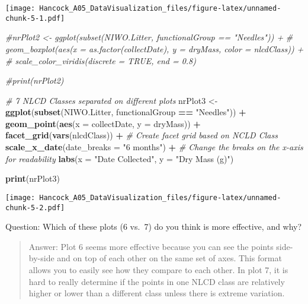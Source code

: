 \documentclass[
]{article}
\newenvironment{Shaded}{\begin{snugshade}}{\end{snugshade}}
\newcommand{\CommentTok}[1]{\textcolor[rgb]{0.56,0.35,0.01}{\textit{#1}}}
\newcommand{\DataTypeTok}[1]{\textcolor[rgb]{0.13,0.29,0.53}{#1}}
\newcommand{\KeywordTok}[1]{\textcolor[rgb]{0.13,0.29,0.53}{\textbf{#1}}}
\newcommand{\NormalTok}[1]{#1}
\newcommand{\OperatorTok}[1]{\textcolor[rgb]{0.81,0.36,0.00}{\textbf{#1}}}
\newcommand{\StringTok}[1]{\textcolor[rgb]{0.31,0.60,0.02}{#1}}
\begin{document}
\texttt{[image: Hancock\_A05\_DataVisualization\_files/figure-latex/unnamed-chunk-5-1.pdf]}

\begin{Shaded}
\begin{Highlighting}[]
\CommentTok{#nrPlot2 <- ggplot(subset(NIWO.Litter, functionalGroup == "Needles")) +}
\CommentTok{#  geom_boxplot(aes(x = as.factor(collectDate), y = dryMass, color = nlcdClass)) +}
\CommentTok{#  scale_color_viridis(discrete = TRUE, end = 0.8)}

\CommentTok{#print(nrPlot2)}

\CommentTok{# 7 NLCD Classes separated on different plots}
\NormalTok{nrPlot3 <-}\StringTok{ }\KeywordTok{ggplot}\NormalTok{(}\KeywordTok{subset}\NormalTok{(NIWO.Litter, functionalGroup }\OperatorTok{==}\StringTok{ "Needles"}\NormalTok{)) }\OperatorTok{+}
\StringTok{  }\KeywordTok{geom_point}\NormalTok{(}\KeywordTok{aes}\NormalTok{(}\DataTypeTok{x =}\NormalTok{ collectDate, }\DataTypeTok{y =}\NormalTok{ dryMass)) }\OperatorTok{+}
\StringTok{  }\KeywordTok{facet_grid}\NormalTok{(}\KeywordTok{vars}\NormalTok{(nlcdClass)) }\OperatorTok{+}\StringTok{ }\CommentTok{# Create facet grid based on NCLD Class}
\StringTok{  }\KeywordTok{scale_x_date}\NormalTok{(}\DataTypeTok{date_breaks =} \StringTok{"6 months"}\NormalTok{) }\OperatorTok{+}\StringTok{ }\CommentTok{# Change the breaks on the x-axis for readability}
\StringTok{  }\KeywordTok{labs}\NormalTok{(}\DataTypeTok{x =} \StringTok{"Date Collected"}\NormalTok{, }\DataTypeTok{y =} \StringTok{"Dry Mass (g)"}\NormalTok{)}

\KeywordTok{print}\NormalTok{(nrPlot3)}
\end{Highlighting}
\end{Shaded}

\texttt{[image: Hancock\_A05\_DataVisualization\_files/figure-latex/unnamed-chunk-5-2.pdf]}

Question: Which of these plots (6 vs.~7) do you think is more effective,
and why?

\begin{quote}
Answer: Plot 6 seems more effective because you can see the points
side-by-side and on top of each other on the same set of axes. This
format allows you to easily see how they compare to each other. In plot
7, it is hard to really determine if the points in one NLCD class are
relatively higher or lower than a different class unless there is
extreme variation.
\end{quote}
\end{document}
